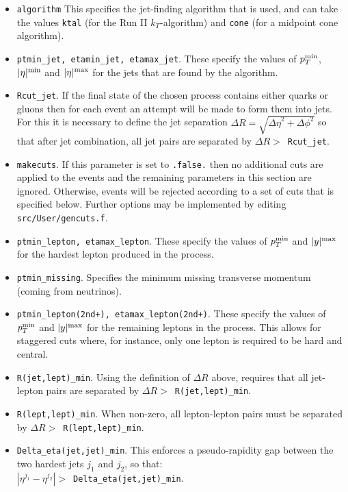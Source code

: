 \documentclass[12pt]{article}
\begin{document}
\begin{itemize}
\item {\tt algorithm} This specifies the jet-finding algorithm that
is used, and can take the values
{\tt ktal} (for the Run II $k_T$-algorithm) and {\tt cone} (for
a midpoint cone algorithm).

\item {\tt ptmin\_jet, etamin\_jet, etamax\_jet}. These specify the values
of $p_T^{\rm min}$, $|\eta|^{\rm min}$ and $|\eta|^{\rm max}$ for the
jets that are found by the algorithm. 

\item {\tt Rcut\_jet}. If the final state of the chosen process contains
either quarks or gluons then for each event an attempt will be made
to form them into jets. For this it is necessary to define the
jet separation $\Delta R=\sqrt{{\Delta \eta}^2 + {\Delta \phi}^2}$
so that after jet combination, all jet pairs are separated by
$\Delta R >$~{\tt Rcut\_jet}.

\item {\tt makecuts}. If this parameter is set to {\tt .false.} then
no additional cuts are applied to the events and the remaining
parameters in this section are ignored. Otherwise, events will
be rejected according to a set of cuts that is specified below.
Further options may be implemented by editing {\tt src/User/gencuts.f}.

\item {\tt ptmin\_lepton, etamax\_lepton}. These specify the values
of $p_T^{\rm min}$ and $|y|^{\rm max}$ for the hardest lepton produced
in the process.
\item {\tt ptmin\_missing}. Specifies the minimum missing transverse
momentum (coming from neutrinos).
\item {\tt ptmin\_lepton(2nd+), etamax\_lepton(2nd+)}. These specify
the values of $p_T^{\rm min}$ and $|y|^{\rm max}$ for the remaining
leptons in the process. This allows for staggered cuts where, for
instance, only one lepton is required to be hard and central.

\item {\tt R(jet,lept)\_min}. Using the definition of $\Delta R$ above,
requires that all jet-lepton pairs are separated by
$\Delta R >$~{\tt R(jet,lept)\_min}.

\item {\tt R(lept,lept)\_min}. When non-zero, all lepton-lepton pairs
must be separated by $\Delta R >$~{\tt R(lept,lept)\_min}.

\item {\tt Delta\_eta(jet,jet)\_min}. This enforces a pseudo-rapidity
gap between the two hardest jets $j_1$ and $j_2$, so that: \\
$|\eta^{j_1} - \eta^{j_2}| >$~{\tt Delta\_eta(jet,jet)\_min}.


\end{itemize}
\end{document}
